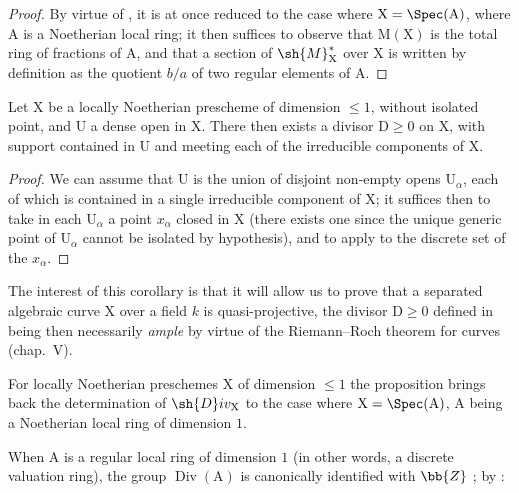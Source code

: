 \begin{proof}
By virtue of , it is at once reduced to the case where $\mathrm{X}=\Spec(\mathrm{A})$, where $\mathrm{A}$ is a Noetherian local ring;
it then suffices to observe that $\mathrm{M}(\mathrm{X})$ is the total ring of fractions of $\mathrm{A}$, and that a section of $\sh{M}^*_\mathrm{X}$ over $\mathrm{X}$ is written by definition as the quotient $b/a$ of two regular elements of $\mathrm{A}$.
\end{proof}

\begin{corollary}[21.9.7]
\label{IV.21.9.7}
Let $\mathrm{X}$ be a locally Noetherian prescheme of dimension $\leq 1$, without isolated point, and $\mathrm{U}$ a dense open in $\mathrm{X}$.
There then exists a divisor $\mathrm{D}\geq 0$ on $\mathrm{X}$, with support contained in $\mathrm{U}$ and meeting each of the irreducible components of $\mathrm{X}$.
\end{corollary}

\begin{proof}
We can assume that $\mathrm{U}$ is the union of disjoint non-empty opens $\mathrm{U}_\alpha$, each of which is contained in a single irreducible component of $\mathrm{X}$;
it suffices then to take in each $\mathrm{U}_\alpha$ a point $x_\alpha$ closed in $\mathrm{X}$ (there exists one since the unique generic point of $\mathrm{U}_\alpha$ cannot be isolated by hypothesis), and to apply  to the discrete set of the $x_\alpha$.
\end{proof}

The interest of this corollary is that it will allow us to prove that a separated algebraic curve $\mathrm{X}$ over a field $k$ is quasi-projective, the divisor $\mathrm{D}\geq 0$ defined in  being then necessarily \emph{ample} by virtue of the Riemann--Roch theorem for curves (chap.~V).

\begin{env}[21.9.8]
\label{IV.21.9.8}
For locally Noetherian preschemes $\mathrm{X}$ of dimension $\leq 1$ the proposition  brings back the determination of $\sh{D}iv_\mathrm{X}$ to the case where $\mathrm{X}=\Spec(\mathrm{A})$, $\mathrm{A}$ being a Noetherian local ring of dimension $1$.

When $\mathrm{A}$ is a regular local ring of dimension $1$ (in other words, a discrete valuation ring), the group $\operatorname{Div}(\mathrm{A})$ is canonically identified with $\bb{Z}$ ;
by :
\end{env}

